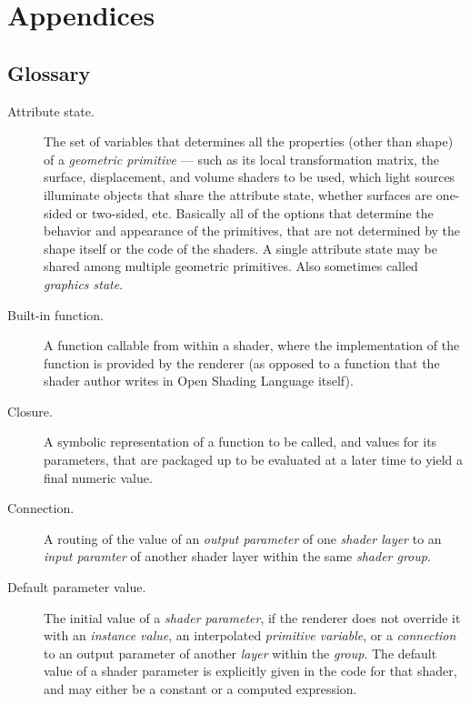 \documentclass[11pt,letterpaper]{book}
\def\langname{Open Shading Language\xspace}
\begin{document}

\part*{Appendices}
\begin{appendix}

\chapter{Glossary}
\label{chap:glossary}

\begin{description}

\item[Attribute state.] The set of variables that determines all the
  properties (other than shape) of a \emph{geometric primitive} --- such
  as its local transformation matrix, the surface, displacement, and
  volume shaders to be used, which light sources illuminate objects that
  share the attribute state, whether surfaces are one-sided or
  two-sided, etc.  Basically all of the options that determine the
  behavior and appearance of the primitives, that are not determined by
  the shape itself or the code of the shaders.  A single attribute state
  may be shared among multiple geometric primitives.  Also sometimes
  called \emph{graphics state}.

\item[Built-in function.] A function callable from within a shader, where
  the implementation of the function is provided by the renderer (as
  opposed to a function that the shader author writes in \langname
  itself).

\item[Closure.] A symbolic representation of a function to be called,
  and values for its parameters, that are packaged up to be evaluated
  at a later time to yield a final numeric value.

\item[Connection.] A routing of the value of an \emph{output parameter}
  of one \emph{shader layer} to an \emph{input paramter} of another
  shader layer within the same \emph{shader group}.

\item[Default parameter value.] The initial value of a \emph{shader
  parameter}, if the renderer does not override it with an
  \emph{instance value}, an interpolated \emph{primitive variable}, or a
  \emph{connection} to an output parameter of another \emph{layer}
  within the \emph{group}.  The default value of a shader parameter
  is explicitly given in the code for that shader, and may either be
  a constant or a computed expression.


\end{description}
\end{appendix}
\end{document}

